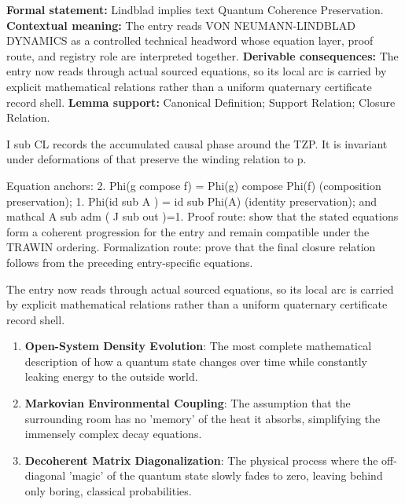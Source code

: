 \begingroup\footnotesize\setlength{\emergencystretch}{3em}\sloppy
\textbf{Formal statement:} Lindblad implies text Quantum Coherence Preservation. \textbf{Contextual meaning:} The entry reads VON NEUMANN-LINDBLAD DYNAMICS as a controlled technical headword whose equation layer, proof route, and registry role are interpreted together. \textbf{Derivable consequences:} The entry now reads through actual sourced equations, so its local arc is carried by explicit mathematical relations rather than a uniform quaternary certificate record shell. \textbf{Lemma support:} Canonical Definition; Support Relation; Closure Relation.\par
\endgroup

I sub CL records the accumulated causal phase around the TZP. It is invariant under deformations of that preserve the winding relation to p.

Equation anchors: 2. Phi(g compose f) = Phi(g) compose Phi(f) (composition preservation); 1. Phi(id sub A ) = id sub Phi(A) (identity preservation); and mathcal A sub adm ( J sub out )=1. Proof route: show that the stated equations form a coherent progression for the entry and remain compatible under the TRAWIN ordering. Formalization route: prove that the final closure relation follows from the preceding entry-specific equations.

The entry now reads through actual sourced equations, so its local arc is carried by explicit mathematical relations rather than a uniform quaternary certificate record shell.
\endgroup

\begin{enumerate}[leftmargin=1.6em,itemsep=6pt,topsep=4pt]
\item \textbf{Open-System Density Evolution}: The most complete mathematical description of how a quantum state changes over time while constantly leaking energy to the outside world.
\item \textbf{Markovian Environmental Coupling}: The assumption that the surrounding room has no 'memory' of the heat it absorbs, simplifying the immensely complex decay equations.
\item \textbf{Decoherent Matrix Diagonalization}: The physical process where the off-diagonal 'magic' of the quantum state slowly fades to zero, leaving behind only boring, classical probabilities.
\end{enumerate}

